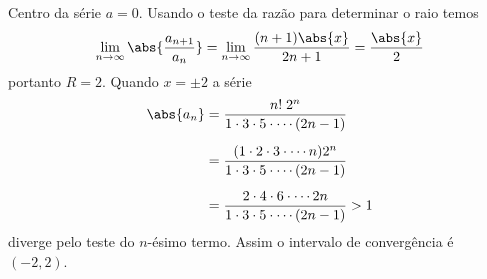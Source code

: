 \begin{exercises}
\begin{exercise}
\begin{answer}
\begin{alphalist}
  \item Centro da série $a=0$.
  Usando o teste da razão para determinar o raio temos
  \[
    \lim_{n\to\infty}\abs{\frac{a_{n+1}}{a_n}} =
    \lim_{n\to\infty} \frac{(n+1)\abs{x}}{2n+1} =
    \frac{\abs{x}}{2}
  \]
  portanto $R=2$.
  Quando $x=\pm 2$ a série
  \begin{align*}
  	\abs{a_n} & = \frac{n!\;2^n}{1\cdot 3\cdot 5\cdot \cdots(2n-1)}                               \\[2mm]
  	          & = \frac{(1\cdot 2\cdot 3\cdot \cdots n)2^n}{1\cdot 3\cdot 5\cdot \cdots(2n-1)} \\[2mm]
  	          & = \frac{2\cdot 4\cdot 6\cdot \cdots 2n}{1\cdot 3\cdot 5\cdot \cdots(2n-1)} >1
  \end{align*}
  diverge pelo teste do $n$-ésimo termo.
  Assim o intervalo de convergência é $\left(-2, 2\right)$.

  \end{alphalist}
\end{answer}
\end{exercise}


\end{exercises}

